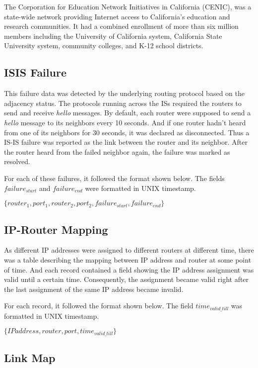 \documentclass[conference, twocolumn, oneside, 10pt]{IEEEtran}
\begin{document}
The Corporation for Education Network Initiatives in California (CENIC), was a state-wide network providing Internet access to California's education and research communities.\cite{cenic2013online} It had a combined enrollment of more than six million members including the University of California system, California State University system, community colleges, and K-12 school districts.

\subsection{ISIS Failure}

This failure data was detected by the underlying routing protocol based on the adjacency status. The protocols running across the ISs required the routers to send and receive \textit{hello} messages. By default, each router were supposed to send a \textit{hello} message to its neighbors every 10 seconds. And if one router hadn't heard from one of its neighbors for 30 seconds, it was declared as disconnected. Thus a IS-IS failure was reported as the link between the router and its neighbor. After the router heard from the failed neighbor again, the failure was marked as resolved.

For each of these failures, it followed the format shown below. The fields $failure_{start}$ and $failure_{end}$ were formatted in UNIX timestamp.

$\{router_1, port_1, router_2, port_2, failure_{start}, failure_{end}\}$

\subsection{IP-Router Mapping}

As different IP addresses were assigned to different routers at different time, there was a table describing the mapping between IP address and router at some point of time. And each record contained a field showing the IP address assignment was valid until a certain time. Consequently, the assignment became valid right after the last assignment of the same IP address became invalid.

For each record, it followed the format shown below. The field $time_{valid\_till}$ was formatted in UNIX timestamp.

$\{IP address, router, port, time_{valid\_till}\}$

\subsection{Link Map}
\end{document}
